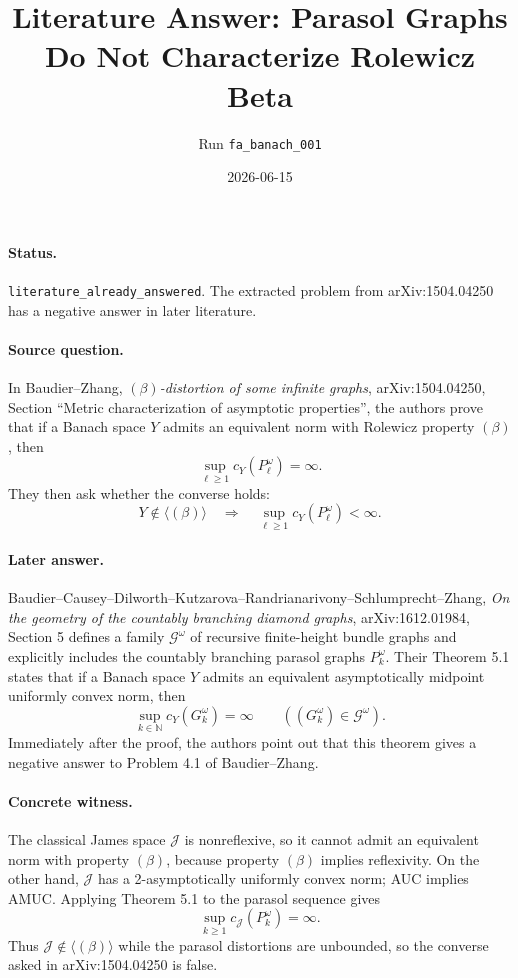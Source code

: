 \documentclass[11pt]{article}
\title{Literature Answer: Parasol Graphs Do Not Characterize Rolewicz Beta}
\author{Run \texttt{fa\_banach\_001}}
\date{2026-06-15}
\begin{document}
\maketitle

\paragraph{Status.}
\texttt{literature\_already\_answered}.  The extracted problem from
arXiv:1504.04250 has a negative answer in later literature.

\paragraph{Source question.}
In Baudier--Zhang, \emph{\((\beta)\)-distortion of some infinite graphs},
arXiv:1504.04250, Section ``Metric characterization of asymptotic properties'',
the authors prove that if a Banach space \(Y\) admits an equivalent norm with
Rolewicz property \((\beta)\), then
\[
  \sup_{\ell\ge 1} c_Y(P^\omega_\ell)=\infty .
\]
They then ask whether the converse holds:
\[
  Y\notin\langle(\beta)\rangle
  \quad\Longrightarrow\quad
  \sup_{\ell\ge 1} c_Y(P^\omega_\ell)<\infty .
\]

\paragraph{Later answer.}
Baudier--Causey--Dilworth--Kutzarova--Randrianarivony--Schlumprecht--Zhang,
\emph{On the geometry of the countably branching diamond graphs},
arXiv:1612.01984, Section 5 defines a family \(\mathcal G^\omega\) of recursive
finite-height bundle graphs and explicitly includes the countably branching
parasol graphs \(P^\omega_k\).  Their Theorem 5.1 states that if a Banach
space \(Y\) admits an equivalent asymptotically midpoint uniformly convex
norm, then
\[
  \sup_{k\in\mathbb N} c_Y(G^\omega_k)=\infty
  \qquad ((G^\omega_k)\in\mathcal G^\omega).
\]
Immediately after the proof, the authors point out that this theorem gives a
negative answer to Problem 4.1 of Baudier--Zhang.

\paragraph{Concrete witness.}
The classical James space \(\mathcal J\) is nonreflexive, so it cannot admit
an equivalent norm with property \((\beta)\), because property \((\beta)\)
implies reflexivity.  On the other hand, \(\mathcal J\) has a
2-asymptotically uniformly convex norm; AUC implies AMUC.  Applying Theorem 5.1
to the parasol sequence gives
\[
  \sup_{k\ge 1} c_{\mathcal J}(P^\omega_k)=\infty .
\]
Thus \(\mathcal J\notin\langle(\beta)\rangle\) while the parasol distortions are
unbounded, so the converse asked in arXiv:1504.04250 is false.
\end{document}
